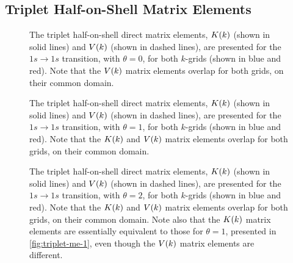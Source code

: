 \documentclass{article}
\begin{document}
\subsection{Triplet Half-on-Shell Matrix Elements}
\label{sec:triplet-me}

\begin{figure}[h]
  \begin{center}
    
  \end{center}
  \caption[Triplet $\theta = 0$]{
    The triplet half-on-shell direct matrix elements, $K(k)$ (shown in solid
    lines) and $V(k)$ (shown in dashed lines), are presented for the $1s \to
    1s$ transition, with $\theta = 0$, for both $k$-grids (shown in blue and
    red).
    Note that the $V(k)$ matrix elements overlap for both grids, on their
    common domain.
  }
  \label{fig:triplet-me-0}
\end{figure}

\begin{figure}[h]
  \begin{center}
    
  \end{center}
  \caption[Triplet $\theta = 1$]{
    The triplet half-on-shell direct matrix elements, $K(k)$ (shown in solid
    lines) and $V(k)$ (shown in dashed lines), are presented for the $1s \to
    1s$ transition, with $\theta = 1$, for both $k$-grids (shown in blue and
    red).
    Note that the $K(k)$ and $V(k)$ matrix elements overlap for both
    grids, on their common domain.
  }
  \label{fig:triplet-me-1}
\end{figure}

\begin{figure}[h]
  \begin{center}
    
  \end{center}
  \caption[Triplet $\theta = 2$]{
    The triplet half-on-shell direct matrix elements, $K(k)$ (shown in solid
    lines) and $V(k)$ (shown in dashed lines), are presented for the $1s \to
    1s$ transition, with $\theta = 2$, for both $k$-grids (shown in blue and
    red).
    Note that the $K(k)$ and $V(k)$ matrix elements overlap for both
    grids, on their common domain.
    Note also that the $K(k)$ matrix elements are essentially equivalent to
    those for $\theta = 1$, presented in \autoref{fig:triplet-me-1}, even though
    the $V(k)$ matrix elements are different.
  }
  \label{fig:triplet-me-2}
\end{figure}
\end{document}
